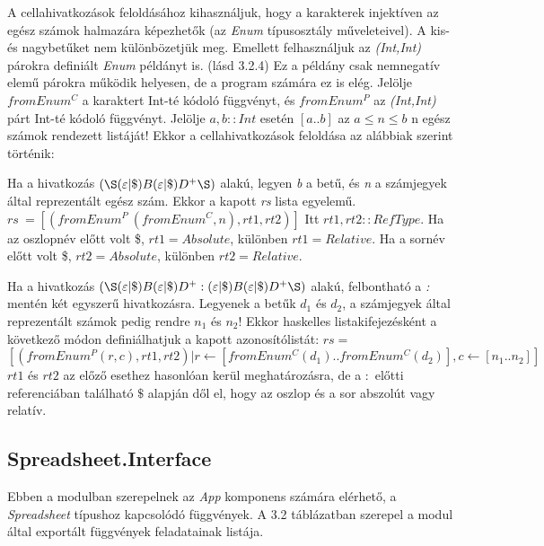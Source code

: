 A cellahivatkozások feloldásához kihasználjuk, hogy a karakterek injektíven az egész számok halmazára képezhetők (az \textit{Enum} típusosztály műveleteivel). A kis- és nagybetűket nem különbözetjük meg. Emellett felhasználjuk az \textit{(Int,Int)} párokra definiált \textit{Enum} példányt is. (lásd 3.2.4) Ez a példány csak nemnegatív elemű párokra működik helyesen, de a program számára ez is elég. Jelölje $fromEnum^C$ a karaktert Int-té kódoló függvényt, és $fromEnum^P$ az \textit{(Int,Int)} párt Int-té kódoló függvényt. Jelölje $a,b :: Int$ esetén $[a..b]$ az $a \le n \le b$ n egész számok rendezett listáját! Ekkor a cellahivatkozások feloldása az alábbiak szerint történik:
\begin{compactenum}
	\item Ha a hivatkozás $(\S (\varepsilon|\$)B(\varepsilon|\$)D^+\S )$ alakú, legyen \textit{b} a betű, és \textit{n} a számjegyek által reprezentált egész szám. Ekkor a kapott  \textit{rs} lista egyelemű. $rs\ = [(fromEnum^P\ (fromEnum^C,n), rt1, rt2)]$ Itt $rt1,rt2 :: RefType$. Ha az oszlopnév előtt volt \$, $rt1=Absolute$, különben $rt1=Relative$. Ha a sornév előtt volt \$, $rt2=Absolute$, különben $rt2=Relative$.
	\item Ha a hivatkozás $(\S  (\varepsilon|\$)B(\varepsilon|\$)D^+:(\varepsilon|\$)B(\varepsilon|\$)D^+\S )$ alakú, felbontható a \textit{:} mentén két egyszerű hivatkozásra. Legyenek a betűk $d_1$ és $d_2$, a számjegyek által reprezentált számok pedig rendre $n_1$ és $n_2$! Ekkor haskelles listakifejezésként a következő módon definiálhatjuk a kapott azonosítólistát: $rs =$ \mbox{$[(fromEnum^P (r,c), rt1, rt2) | r \leftarrow [fromEnum^C(d_1)..fromEnum^C(d_2)], c \leftarrow [n_1..n_2]]$} $rt1$ és $rt2$ az előző esethez hasonlóan kerül meghatározásra, de a $:$ előtti referenciában található $\$$ alapján dől el, hogy az oszlop és a sor abszolút vagy relatív.
	
\end{compactenum}

\subsection{Spreadsheet.Interface}

Ebben a modulban szerepelnek az \textit{App} komponens számára elérhető, a \textit{Spreadsheet} típushoz kapcsolódó függvények. A 3.2 táblázatban szerepel a modul által exportált függvények feladatainak listája.

